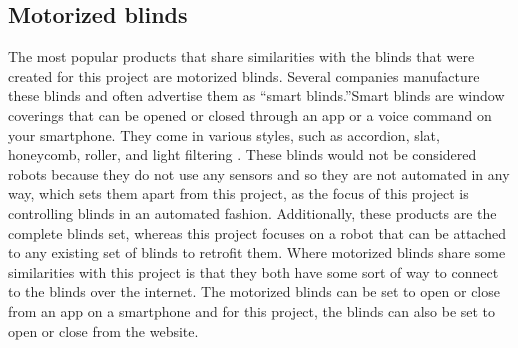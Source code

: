 \documentclass[10pt,twocolumn]{article}
\begin{document}
\subsection{Motorized blinds}
The most popular products that share similarities with the blinds that were created for this project are motorized blinds. Several companies manufacture these blinds and often advertise them as “smart blinds.”Smart blinds are window coverings that can be opened or closed through an app or a voice command on your smartphone. They come in various styles, such as accordion, slat, honeycomb, roller, and light filtering \cite{Alina20228BestSmartBlinds}. These blinds would not be considered robots because they do not use any sensors and so they are not automated in any way, which sets them apart from this project, as the focus of this project is controlling blinds in an automated fashion. Additionally, these products are the complete blinds set, whereas this project focuses on a robot that can be attached to any existing set of blinds to retrofit them. Where motorized blinds share some similarities with this project is that they both have some sort of way to connect to the blinds over the internet. The motorized blinds can be set to open or close from an app on a smartphone and for this project, the blinds can also be set to open or close from the website.
\end{document}
